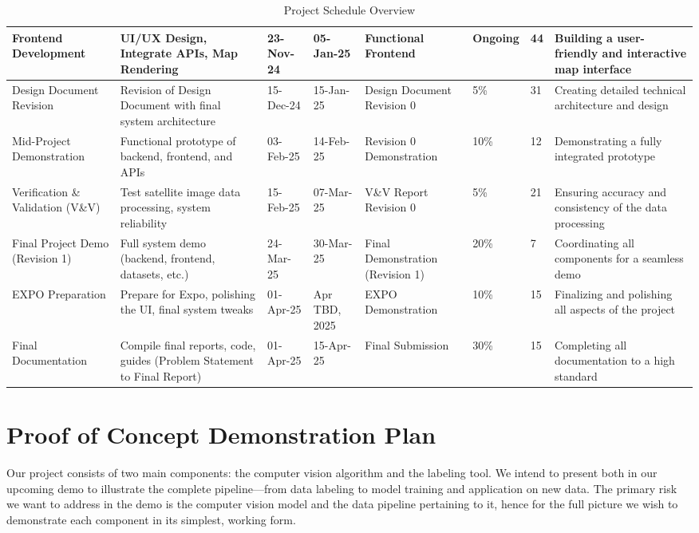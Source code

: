 \documentclass{article}
\begin{document}
\begin{table}[h!]
\begin{adjustbox}{max width=\textwidth}
\begin{tabular}{|p{3cm}|p{5cm}|p{2.5cm}|p{2.5cm}|p{4cm}|p{2cm}|p{2.5cm}|p{4cm}|}
  Frontend Development & UI/UX Design, Integrate APIs, Map Rendering & 23-Nov-24 & 05-Jan-25 & Functional Frontend & Ongoing & 44 & Building a user-friendly and interactive map interface \\ \hline
  Design Document Revision & Revision of Design Document with final system architecture & 15-Dec-24 & 15-Jan-25 & Design Document Revision 0 & 5\% & 31 & Creating detailed technical architecture and design \\ \hline
  Mid-Project Demonstration & Functional prototype of backend, frontend, and APIs & 03-Feb-25 & 14-Feb-25 & Revision 0 Demonstration & 10\% & 12 & Demonstrating a fully integrated prototype \\ \hline
  Verification \& Validation (V\&V) & Test satellite image data processing, system reliability & 15-Feb-25 & 07-Mar-25 & V\&V Report Revision 0 & 5\% & 21 & Ensuring accuracy and consistency of the data processing \\ \hline
  Final Project Demo (Revision 1) & Full system demo (backend, frontend, datasets, etc.) & 24-Mar-25 & 30-Mar-25 & Final Demonstration (Revision 1) & 20\% & 7 & Coordinating all components for a seamless demo \\ \hline
  EXPO Preparation & Prepare for Expo, polishing the UI, final system tweaks & 01-Apr-25 & Apr TBD, 2025 & EXPO Demonstration & 10\% & 15 & Finalizing and polishing all aspects of the project \\ \hline
  Final Documentation & Compile final reports, code, guides (Problem Statement to Final Report) & 01-Apr-25 & 15-Apr-25 & Final Submission & 30\% & 15 & Completing all documentation to a high standard \\ \hline
  \end{tabular}
  \end{adjustbox}
  \caption{Project Schedule Overview}
  \end{table}


\section{Proof of Concept Demonstration Plan}

Our project consists of two main components: the computer vision algorithm and the labeling tool. We intend to present both in our upcoming demo to illustrate the complete pipeline—from data labeling to model training and application on new data. The primary risk we want to address in the demo is the computer vision model and the data pipeline pertaining to it, hence for the full picture we wish to demonstrate each component in its simplest, working form. \\
\end{document}
